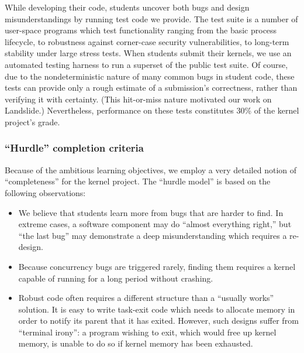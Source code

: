 While developing their code, students uncover both bugs
and design misunderstandings by running test code we
provide.
The test suite is a number of user-space programs which test
functionality ranging from the basic process lifecycle, to robustness
against corner-case security vulnerabilities, to long-term stability
under large stress tests.
%
When students submit their kernels,
we use an automated testing harness to
run a superset of the public test suite.
%
Of course, due to the nondeterministic nature of many common bugs in student code,
these tests can provide only a rough estimate of a submission's correctness,
rather than verifying it with certainty.
(This hit-or-miss nature motivated our work on Landslide.)
Nevertheless, performance on these tests constitutes 30\% of the kernel project's grade.

\subsubsection{``Hurdle'' completion criteria}

Because of the ambitious learning objectives,
we employ a very detailed notion of ``completeness''
for the kernel project.
The ``hurdle model'' is based on the following observations:

\begin{itemize}

\item We believe that students learn more from bugs
that are harder to find.
In extreme cases, a software component may do
``almost everything right,'' but ``the last bug'' may
demonstrate a deep misunderstanding which requires a re-design.

\item Because concurrency bugs are triggered rarely,
finding them requires a kernel capable of running
for a long period without crashing.

\item Robust code often requires a different structure
than a ``usually works'' solution.
It is easy to write task-exit code which
needs to allocate memory in order to notify its
parent that it has exited.
However, such designs suffer from ``terminal irony'':
a program wishing to exit,
which would free up kernel memory,
is unable to do so if kernel memory has been exhausted.

\end{itemize}

